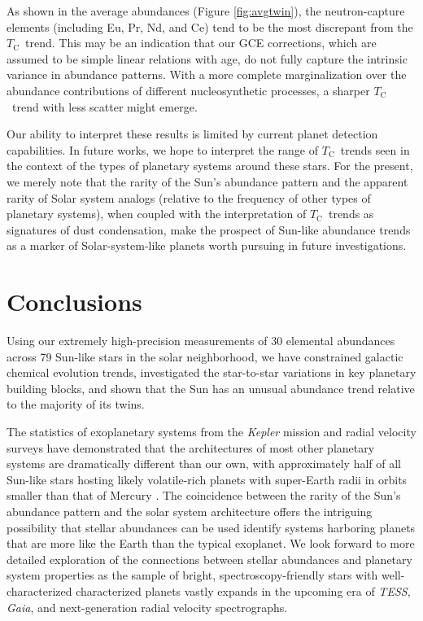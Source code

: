 \documentclass[twocolumn]{aastex62}
\newcommand{\tc}{$T_\mathrm{C}$}
\newcommand{\acronym}[1]{{\small{#1}}}
\begin{document}
As shown in the average abundances (Figure \ref{fig:avgtwin}), the neutron-capture elements (including Eu, Pr, Nd, and Ce) tend to be the most discrepant from the \tc\ trend. This may be an indication that our \acronym{GCE} corrections, which are assumed to be simple linear relations with age, do not fully capture the intrinsic variance in abundance patterns. With a more complete marginalization over the abundance contributions of different nucleosynthetic processes, a sharper \tc\ trend with less scatter might emerge.

Our ability to interpret these results is limited by current planet detection capabilities. In future works, we hope to interpret the range of \tc\ trends seen in the context of the types of planetary systems around these stars. For the present, we merely note that the rarity of the Sun's abundance pattern and the apparent rarity of Solar system analogs (relative to the frequency of other types of planetary systems), when coupled with the interpretation of \tc\ trends as signatures of dust condensation, make the prospect of Sun-like abundance trends as a marker of Solar-system-like planets worth pursuing in future investigations.

\section{Conclusions}

Using our extremely high-precision measurements of 30 elemental abundances across 79 Sun-like stars in the solar neighborhood, we have constrained galactic chemical evolution trends, investigated the star-to-star variations in key planetary building blocks, and shown that the Sun has an unusual abundance trend relative to the majority of its twins.

The statistics of exoplanetary systems from the \textit{Kepler} mission and radial velocity surveys have demonstrated that the architectures of most other planetary systems are dramatically different than our own, with approximately half of all Sun-like stars hosting likely volatile-rich planets with super-Earth radii in orbits smaller than that of Mercury \citep{winn15, rogers15}. 
The coincidence between the rarity of the Sun's abundance pattern and the solar system architecture offers the intriguing possibility that stellar abundances can be used identify systems harboring planets that are more like the Earth than the typical exoplanet. 
We look forward to more detailed exploration of the connections between stellar abundances and planetary system properties as the sample of bright, spectroscopy-friendly stars with well-characterized characterized planets vastly expands in the upcoming era of \textit{\acronym{TESS}}, \textit{Gaia}, and next-generation radial velocity spectrographs.
\end{document}
